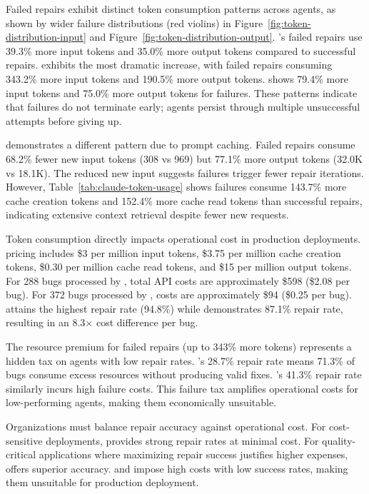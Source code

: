 
Failed repairs exhibit distinct token consumption patterns across agents, as shown by wider failure distributions (red violins) in Figure~\ref{fig:token-distribution-input} and Figure~\ref{fig:token-distribution-output}. \qwencode's failed repairs use 39.3\% more input tokens and 35.0\% more output tokens compared to successful repairs. \geminicli exhibits the most dramatic increase, with failed repairs consuming 343.2\% more input tokens and 190.5\% more output tokens. \codex shows 79.4\% more input tokens and 75.0\% more output tokens for failures. These patterns indicate that failures do not terminate early; agents persist through multiple unsuccessful attempts before giving up.

\claudecode demonstrates a different pattern due to prompt caching. Failed repairs consume 68.2\% fewer new input tokens (308 vs 969) but 77.1\% more output tokens (32.0K vs 18.1K). The reduced new input suggests failures trigger fewer repair iterations. However, Table~\ref{tab:claude-token-usage} shows failures consume 143.7\% more cache creation tokens and 152.4\% more cache read tokens than successful repairs, indicating extensive context retrieval despite fewer new requests.


Token consumption directly impacts operational cost in production deployments. \sonnet pricing includes \$3 per million input tokens, \$3.75 per million cache creation tokens, \$0.30 per million cache read tokens, and \$15 per million output tokens. For 288 bugs processed by \claudecode, total API costs are approximately \$598 (\$2.08 per bug). For 372 bugs processed by \codex, costs are approximately \$94 (\$0.25 per bug). \claudecode attains the highest repair rate (94.8\%) while \codex demonstrates 87.1\% repair rate, resulting in an 8.3$\times$ cost difference per bug.

The resource premium for failed repairs (up to 343\% more tokens) represents a hidden tax on agents with low repair rates. \qwencode's 28.7\% repair rate means 71.3\% of bugs consume excess resources without producing valid fixes. \geminicli's 41.3\% repair rate similarly incurs high failure costs. This failure tax amplifies operational costs for low-performing agents, making them economically unsuitable.

Organizations must balance repair accuracy against operational cost. For cost-sensitive deployments, \codex provides strong repair rates at minimal cost. For quality-critical applications where maximizing repair success justifies higher expenses, \claudecode offers superior accuracy. \geminicli and \qwencode impose high costs with low success rates, making them unsuitable for production deployment.








